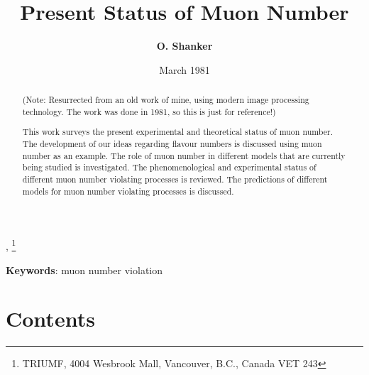 \documentclass[twoside]{article}
\begin{document}


\newtheorem{theorem}{Theorem}[section]
\newtheorem{lemma}[theorem]{Lemma}

\theoremstyle{definition}
\newtheorem{definition}[theorem]{Definition}
\newtheorem{example}[theorem]{Example}
\newtheorem{xca}[theorem]{Exercise}

\theoremstyle{remark}
\newtheorem{remark}[theorem]{Remark}



\date{March 1981}
\lhead[]{}
\rhead[]{}

\title{\bf{Present Status of Muon Number}}

\maketitle


\author{\textbf{O. Shanker}},
\thanks{ TRIUMF, 4004 Wesbrook Mall, Vancouver, B.C., Canada VET 243 }

\thispagestyle{fancy}

\begin{abstract}
(Note: Resurrected from an  old work of mine, using modern image processing technology.
The work was done in 1981, so this is just for reference!)

This work surveys the present experimental and theoretical status
of muon number. The development of our ideas regarding flavour numbers
is discussed using muon number as an example.
The role of muon number
in different models that are currently being studied is investigated.
The phenomenological and experimental status of different muon number
violating processes is reviewed. The predictions of different models
for muon number violating processes is discussed.

\end{abstract}
{\textbf {Keywords}:} muon number violation





\section*{Contents}
\end{document}

